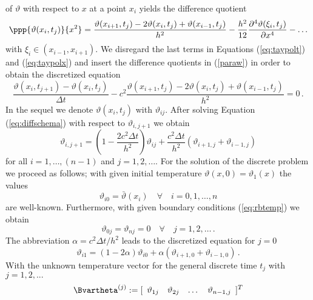 of $\vartheta$ with respect to $x$ at a point $x_i$ 
yields the difference quotient 
%
\begin{equation}
 \ppp{\vartheta(x_i,t_j)}{x^2} = 
 \dfrac{\vartheta(x_{i+1},t_j) - 2 \vartheta (x_i,t_j) +
 \vartheta(x_{i-1},t_j)}{h^2} - \frac{h^2}{12} 
 \dfrac{\partial^4 \vartheta (\xi_i , t_j)}{\partial x^4} 
 - \dots
\label{eq:taypolx}
\end{equation}
%
with $\xi_i \in (x_{i-1}, x_{i+1})$. 
We disregard the last terms in Equations 
(\ref{eq:taypolt}) and (\ref{eq:taypolx}) and insert 
the difference quotients in (\ref{paraw}) in order 
to obtain the discretized equation 
%
\begin{equation}
 \dfrac{\vartheta(x_i,t_{j+1} ) 
 -\vartheta(x_i,t_j)}{\Delta t}
 -c^2\dfrac{\vartheta(x_{i+1},t_j)
 -2\vartheta(x_i,t_j) + \vartheta (x_{i-1} , t_j)}{h^2} = 0 \, .
\label{eq:diffschema}
\end{equation}
%
In the sequel we denote $\vartheta (x_i , t_j)$ with 
$\vartheta_{ij}$. 
After solving Equation (\ref{eq:diffschema}) 
with respect to $\vartheta_{i,j+1}$ we obtain 
%
\begin{equation}
 \vartheta_{i,j+1} = \left(1-\dfrac{2 c^2 \Delta t}{h^2}\right)
 \vartheta_{ij}+\dfrac{c^2\Delta t}{h^2}(\vartheta_{i+1,j}
 +\vartheta_{i-1,j})
\end{equation}
%
for all $i=1,\dots,(n-1)$ and $j=1,2, \dots $.
For the solution of the discrete problem we proceed as follows;
with given initial temperature $\vartheta(x,0)=\vartheta_1(x)$
the values
%
\begin{equation}
\vartheta_{i0} = \bar\vartheta (x_i) \quad \forall \quad i = 0, 1, \dots , n
\end{equation}
%
are well-known.
Furthermore, with given boundary conditions (\ref{eq:rbtemp})
we obtain
%
\begin{equation}
 \vartheta_{0j} = \vartheta_{nj} = 0
 \quad \forall \quad j = 1, 2, \dots \,.
\end{equation}
%
The abbreviation $\alpha = c^2 \Delta t / h^2$ 
leads to the discretized equation for $j=0$ 
%
\begin{equation}
\vartheta_{i1} = (1 - 2 \alpha ) \vartheta_{i0} + \alpha
(\vartheta_{i+1,0} + \vartheta_{i-1,0}) \, . 
\label{eq:thetai1}
\end{equation}
%
With the unknown temperature vector for the general 
discrete time $t_j$ with $ j = 1, 2 , ...$
%
\begin{equation}
\Bvartheta^{(j)} := [ 
\begin{array}{cccc}
\vartheta_{1j} & \vartheta_{2j} & \dots & \vartheta_{n-1,j}
\end{array}
]^T 
\end{equation}
